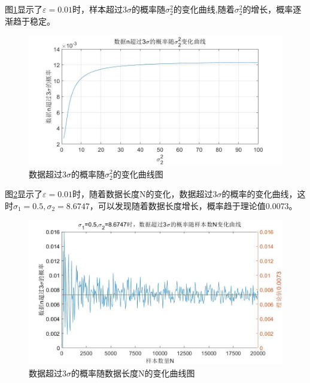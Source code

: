 \documentclass[fontset=windows]{article}
\numberwithin{figure}{section}
\begin{document}
图\ref*{fig:4}显示了\(\varepsilon=0.01\)时，样本超过\(3\sigma\)的概率随\(\sigma^2_2\)的变化曲线,随着\(\sigma^2_2\)的增长，概率逐渐趋于稳定。

\begin{figure}[H]
    \centering
    \includegraphics[scale=0.4]{4.jpg}
    \caption{数据超过\(3\sigma\)的概率随\(\sigma^2_2\)的变化曲线图}
    \label{fig:4}
\end{figure}

图\ref*{fig:5}显示了\(\varepsilon=0.01\)时，随着数据长度N的变化，数据超过\(3\sigma\)的概率的变化曲线，这时\(\sigma_1=0.5,\sigma_2=8.6747\)，可以发现随着数据长度增长，概率趋于理论值0.0073。

\begin{figure}[H]
    \centering
    \includegraphics[scale=0.4]{3.jpg}
    \caption{数据超过\(3\sigma\)的概率随数据长度N的变化曲线图}
    \label{fig:5}
\end{figure}




\end{document}
